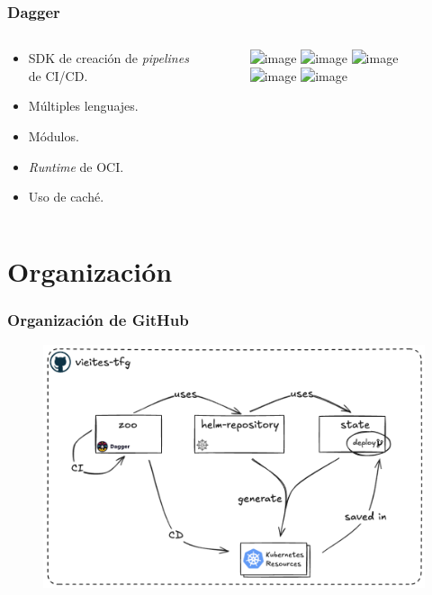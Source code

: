\documentclass{beamer}
\begin{document}
\begin{frame}
    \frametitle{Dagger}
    \begin{columns}
        \begin{column}{0.45\textwidth}
            \begin{itemize}
                \item<1-> SDK de creación de \textit{pipelines} de CI/CD.
                \item<2-> Múltiples lenguajes.
                \item<3-> Módulos.
                \item<4-> {\it Runtime} de OCI.
                \item<5-> Uso de caché.
            \end{itemize}
        \end{column}
        \begin{column}{0.55\textwidth}
            \begin{figure}
                \includegraphics<1>[scale=0.2]{figuras/dagger}
                \includegraphics<2>[scale=0.25]{figuras/languages}
                \includegraphics<3>[scale=0.4]{figuras/daggerverse}
                \includegraphics<4>[scale=0.4]{figuras/docker}
                \includegraphics<5>[scale=0.1]{figuras/cache}
            \end{figure}
        \end{column}
    \end{columns}
\end{frame}

\section{Organización}
\begin{frame}
    \frametitle{Organización de GitHub}
    \begin{figure}
        \includegraphics[scale=0.28]{figuras/vieites-tfg}
    \end{figure}
\end{frame}
\end{document}
